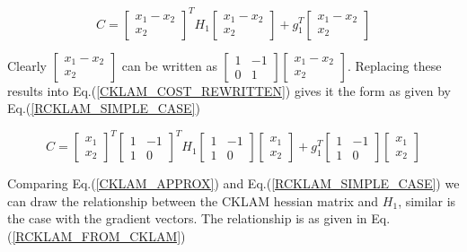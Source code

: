\begin{equation}
	C = \begin{bmatrix} x_1-x_2 \\ x_2 \end{bmatrix} ^TH_1\begin{bmatrix} x_1-x_2 \\ x_2 \end{bmatrix} + g_1^T\begin{bmatrix} x_1-x_2 \\ x_2 \end{bmatrix}
	\label{CKLAM_COST_REWRITTEN}
\end{equation}

Clearly $\begin{bmatrix} x_1-x_2 \\ x_2 \end{bmatrix}$ can be written as $\begin{bmatrix} 1 & -1\\ 0 & 1\end{bmatrix} \begin{bmatrix} x_1-x_2 \\ x_2 \end{bmatrix}$. Replacing these results into Eq.(\ref{CKLAM_COST_REWRITTEN}) gives it the form as given by Eq.(\ref{RCKLAM_SIMPLE_CASE})

\begin{equation}
	C = \begin{bmatrix} x_1 \\ x_2 \end{bmatrix} ^T\begin{bmatrix} 1 & -1\\ 1 & 0 \end{bmatrix}^T H_1\begin{bmatrix} 1 & -1\\ 1 & 0 \end{bmatrix} \begin{bmatrix} x_1 \\ x_2 \end{bmatrix} + g_1^T\begin{bmatrix} 1 & -1\\ 1 & 0 \end{bmatrix}\begin{bmatrix} x_1 \\ x_2 \end{bmatrix}
	\label{RCKLAM_SIMPLE_CASE}
\end{equation}

Comparing Eq.(\ref{CKLAM_APPROX}) and Eq.(\ref{RCKLAM_SIMPLE_CASE}) we can draw the relationship between the CKLAM hessian matrix and $H_1$, similar is the case with the gradient vectors. The relationship is as given in Eq.(\ref{RCKLAM_FROM_CKLAM}) 

